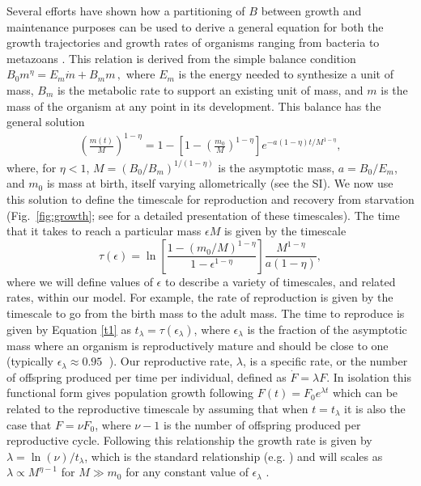 \documentclass[twocolumn,preprintnumbers,amsmath,amssymb,superscriptaddress]{revtex4}
\begin{document}
{Several efforts have shown how a partitioning of $B$ between growth and
maintenance purposes can be used to derive a general equation for both the
growth trajectories and growth rates of organisms ranging from bacteria to
metazoans
\citep{West:2001bv,moses2008rmo,gillooly2002esa,hou,savage2004effects,Kempes:2012hy}. This relation is derived from the simple balance condition 
$B_{0}m^{\eta}=E_{m}\dot{m}+B_{m}m\,,$
\citep{West:2001bv,moses2008rmo,gillooly2002esa,hou,savage2004effects,Kempes:2012hy} where $E_{m}$ is the energy needed to synthesize a unit of mass, $B_{m}$ is
the metabolic rate to support an existing unit of mass, and $m$ is the mass
of the organism at any point in its development.  This balance has the
general solution \citep{bettencourt,Kempes:2012hy}
\begin{eqnarray}
\label{m1}
\left(\frac{m\left(t\right)}{M}\right)^{1-\eta}\!=1\!-\!\left[1\!-\!\left(\frac{m_{0}}{M}\right)^{1\!-\!\eta}\right]e^{-a\left(1\!-\!\eta\right)t/M^{1-\eta}},
\end{eqnarray}
where, for $\eta<1$, $M=(B_{0}/B_{m})^{1/(1-\eta)}$ is the asymptotic mass,
$a=B_{0}/E_{m}$, and $m_0$ is mass at birth, itself varying allometrically
(see the SI).  We now use this solution to define the timescale for
reproduction and recovery from starvation (Fig.~\ref{fig:growth}; see
\citep{moses2008rmo} for a detailed presentation of these timescales). The
time that it takes to reach a particular mass $\epsilon M$ is given by the
timescale
\begin{equation}
\label{t1}
\tau\left(\epsilon\right) = \ln\left[\frac{1-\left(m_{0}/M\right)^{1-\eta}}{1-\epsilon^{1-\eta}}\right]\frac{M^{1-\eta}}{a\left(1-\eta\right)},
\end{equation}
where we will define values of $\epsilon$ to describe a variety of timescales, and related rates, within
our model.  For example, the rate of reproduction is given by the timescale to go from the birth mass to the adult mass. The time to reproduce is given by Equation \ref{t1} as $t_{\lambda}=\tau\left(\epsilon_{\lambda}\right)$, where $\epsilon_{\lambda}$
is the fraction of the asymptotic mass where an organism is reproductively
mature and should be close to one (typically
$\epsilon_{\lambda}\approx0.95\;$ \citep{West:2001bv}). Our reproductive rate, $\lambda$, is a specific rate, or the number of offspring produced per time per individual, defined as $\dot{F} = \lambda F$. In isolation this functional form gives population growth following $F\left(t\right) = F_{0}e^{\lambda t}$ which can be related to the reproductive timescale by assuming that when $t=t_{\lambda}$ it is also the case that $F=\nu F_{0}$, where $\nu-1$ is the number of offspring produced per reproductive cycle. Following this relationship the growth rate is given by $\lambda=\ln\left(\nu\right)/t_{\lambda}$, which is the standard relationship (e.g. \cite{savage2004effects}) and will scales as $\lambda\propto M^{\eta-1}$ for $M\gg m_{0}$ for any constant value of $\epsilon_{\lambda}$
\citep{West:2001bv,moses2008rmo,gillooly2002esa,hou,Kempes:2012hy}.


}
\end{document}
